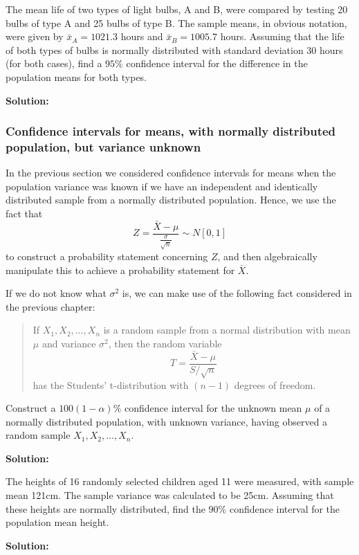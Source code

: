 \documentclass[12pt]{article}
\newenvironment{example}[1][Example:]{\begin{trivlist}
\item[\hskip \labelsep {\bfseries #1}]}{\end{trivlist}}
\begin{document}
\begin{example}
The mean life of two types of light bulbs, A and B, were compared by testing 20 bulbs of type A and 25 bulbs of type B. The sample means, in obvious notation, were given by $\bar{x}_{A}=1021.3$ hours and $\bar{x}_{B}=1005.7$ hours. Assuming that the life of both types of bulbs is normally distributed with standard deviation 30 hours (for both cases), find a $95\%$ confidence interval for the difference in the population means for both types.
\end{example}
\begin{mdframed}
{\bf Solution:}
\textcolor[rgb]{1.00,1.00,1.00}{\lipsum[1-4]}
\end{mdframed}

\subsubsection{Confidence intervals for means, with normally distributed population, but variance unknown}
In the previous section we considered confidence intervals for means when the population variance was known if we have an independent and identically distributed sample from a normally distributed population. Hence, we use the fact that $$Z=\frac{\bar{X}-\mu}{\frac{\sigma}{\sqrt{n}}}\sim N[0,1]$$
to construct a probability statement concerning $Z$, and then algebraically manipulate this to achieve a probability statement for $\bar{X}$.

If we do not know what $\sigma^{2}$ is, we can make use of the following fact considered in the previous chapter:
\begin{quote}
If $X_{1},X_{2},\ldots,X_{n}$ is a random sample from a normal distribution with mean $\mu$ and variance $\sigma^2$, then the random variable $$ T=\frac{\bar{X}-\mu}{S/\sqrt{n}}$$ has the Students' t-distribution with $(n-1)$ degrees of freedom.
\end{quote}

\begin{example}
Construct a $100(1-\alpha)\%$ confidence interval for the unknown mean $\mu$ of a normally distributed population, with unknown variance, having observed a random sample $X_{1},X_{2},\ldots, X_{n}.$
\end{example}
\begin{mdframed}
{\bf Solution:}
\textcolor[rgb]{1.00,1.00,1.00}{\lipsum[1-8]}
\end{mdframed}

\begin{example}
The heights of 16 randomly selected children aged 11 were measured, with sample mean 121cm. The sample variance was calculated to be 25cm. Assuming that these heights are normally distributed, find the $90\%$ confidence interval for the population mean height.
\end{example}
\begin{mdframed}
{\bf Solution:}
\textcolor[rgb]{1.00,1.00,1.00}{\lipsum[1-2]}
\end{mdframed}
\end{document}
